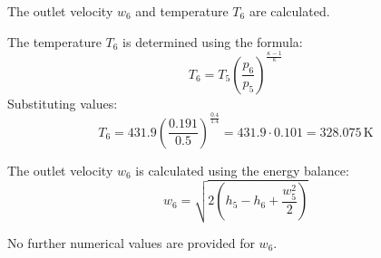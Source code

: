The outlet velocity \( w_6 \) and temperature \( T_6 \) are calculated.  

The temperature \( T_6 \) is determined using the formula:  
\[
T_6 = T_5 \left( \frac{p_6}{p_5} \right)^{\frac{\kappa - 1}{\kappa}}
\]  
Substituting values:  
\[
T_6 = 431.9 \left( \frac{0.191}{0.5} \right)^{\frac{0.4}{1.4}} = 431.9 \cdot 0.101 = 328.075 \, \text{K}
\]  

The outlet velocity \( w_6 \) is calculated using the energy balance:  
\[
w_6 = \sqrt{2 \left( h_5 - h_6 + \frac{w_5^2}{2} \right)}
\]  

No further numerical values are provided for \( w_6 \).